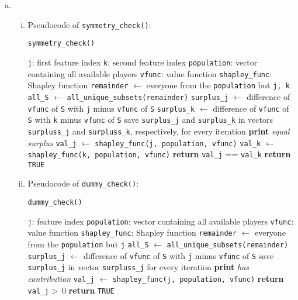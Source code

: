 {\begin{enumerate}[a)]
	\item 
	\begin{enumerate}[(i)]
	\item Pseudocode of \texttt{symmetry\_check()}:
	
	\begin{algorithm}[H]
		\caption{\texttt{symmetry\_check()}}
		\begin{algorithmic}[1]
			\Require \texttt{j}: first feature index
			\Require \texttt{k}: second feature index
			\Require \texttt{population}: vector containing all available players
			\Require \texttt{vfunc}: value function
			\Require \texttt{shapley\_func}: Shapley function
			\State \texttt{remainder} $\gets$ everyone from the \texttt{population} but \texttt{j, k}
			\State \texttt{all\_S} $\gets$ \texttt{all\_unique\_subsets(remainder)}
			\State \texttt{surplus\_j} $\gets$ difference of \texttt{vfunc} of \texttt{S} with \texttt{j} minus \texttt{vfunc} of \texttt{S}
			\State \texttt{surplus\_k} $\gets$ difference of \texttt{vfunc} of \texttt{S} with \texttt{k} minus \texttt{vfunc} of \texttt{S}
			\State save \texttt{surplus\_j} and \texttt{surplus\_k} in vectors \texttt{surpluss\_j} and \texttt{surpluss\_k}, respectively, for every iteration
			\EndFor
			\State \textbf{print} \textit{equal surplus}
			\State \texttt{val\_j} $\gets$ \texttt{shapley\_func(j, population, vfunc)}
			\State \texttt{val\_k} $\gets$ \texttt{shapley\_func(k, population, vfunc)}
			\State \textbf{return} \texttt{val\_j} == \texttt{val\_k}
			\EndIf
			\State \textbf{return} \texttt{TRUE}
		\end{algorithmic}
	\end{algorithm}
	
	\item Pseudocode of \texttt{dummy\_check()}:
	
	\begin{algorithm}[H]
		\caption{\texttt{dummy\_check()}}
		\begin{algorithmic}[1]
			\Require \texttt{j}: feature index
			\Require \texttt{population}: vector containing all available players
			\Require \texttt{vfunc}: value function
			\Require \texttt{shapley\_func}: Shapley function
			\State \texttt{remainder} $\gets$ everyone from the \texttt{population} but \texttt{j}
			\State \texttt{all\_S} $\gets$ \texttt{all\_unique\_subsets(remainder)}
			\State \texttt{surplus\_j} $\gets$ difference of \texttt{vfunc} of \texttt{S} with \texttt{j} minus \texttt{vfunc} of \texttt{S}
			\State save \texttt{surplus\_j} in vector \texttt{surpluss\_j} for every iteration
			\EndFor
			\State \textbf{print} \textit{has contribution}
			\State \texttt{val\_j} $\gets$ \texttt{shapley\_func(j, population, vfunc)}
			\State \textbf{return} \texttt{val\_j} \textgreater\, 0
			\EndIf
			\State \textbf{return} \texttt{TRUE}
		\end{algorithmic}
	\end{algorithm}


\end{enumerate}
\end{enumerate}}
